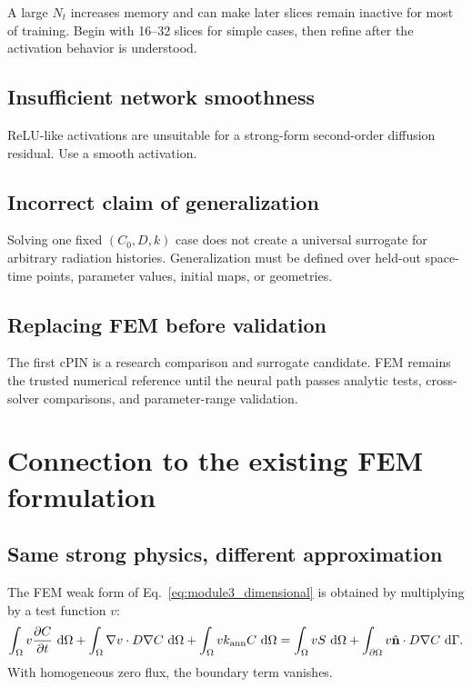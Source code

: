\documentclass[11pt]{article}
\newcommand{\Om}{\Omega}
\providecommand{\dd}{\,\mathrm{d}}
\begin{document}
A large $N_t$ increases memory and can make later slices remain inactive for most of training. Begin with 16--32 slices for simple cases, then refine after the activation behavior is understood.

\subsection{Insufficient network smoothness}

ReLU-like activations are unsuitable for a strong-form second-order diffusion residual. Use a smooth activation.

\subsection{Incorrect claim of generalization}

Solving one fixed $(C_0,D,k)$ case does not create a universal surrogate for arbitrary radiation histories. Generalization must be defined over held-out space-time points, parameter values, initial maps, or geometries.

\subsection{Replacing FEM before validation}

The first cPIN is a research comparison and surrogate candidate. FEM remains the trusted numerical reference until the neural path passes analytic tests, cross-solver comparisons, and parameter-range validation.

\section{Connection to the existing FEM formulation}

\subsection{Same strong physics, different approximation}

The FEM weak form of Eq.~\eqref{eq:module3_dimensional} is obtained by multiplying by a test function $v$:
\begin{equation}
\int_{\Om}
v\pdv{C}{t}\,\dd\Om
+\int_{\Om}
\nabla v\cdot D\nabla C\,\dd\Om
+\int_{\Om}
vk_{\mathrm{ann}}C\,\dd\Om
=
\int_{\Om}vS\,\dd\Om
+\int_{\partial\Om}
v\hat{\mathbf n}\cdot D\nabla C\,\dd\Gamma.
\label{eq:weak_form}
\end{equation}
With homogeneous zero flux, the boundary term vanishes.
\end{document}
